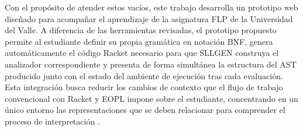 Con el propósito de atender estos vacíos, este trabajo desarrolla un prototipo web diseñado para acompañar el aprendizaje de la asignatura FLP de la Universidad del Valle. A diferencia de las herramientas revisadas, el prototipo propuesto permite al estudiante definir su propia gramática en notación BNF, genera automáticamente el código Racket necesario para que SLLGEN construya el analizador correspondiente y presenta de forma simultánea la estructura del AST producido junto con el estado del ambiente de ejecución tras cada evaluación. Esta integración busca reducir los cambios de contexto que el flujo de trabajo convencional con Racket y EOPL impone sobre el estudiante, concentrando en un único entorno las representaciones que se deben relacionar para comprender el proceso de interpretación \cite{sweller2024cognitive}.
